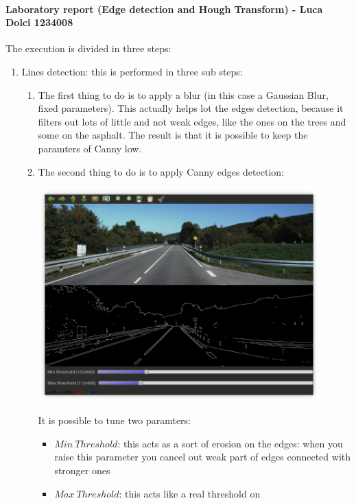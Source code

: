 \documentclass[11pt, a4paper]{toptesi}
\begin{document}
\paragraph{Laboratory report (Edge detection and Hough Transform) - Luca Dolci 1234008}
The execution is divided in three steps:
\begin{enumerate}
    \item Lines detection: this is performed in three sub steps:
        \begin{enumerate}
            \item The first thing to do is to apply a blur (in this case a
                Gaussian Blur, fixed parameters). This actually helps  lot the
                edges detection, because it filters out lots of little and not
                weak edges, like the ones on the trees and some on
                the asphalt. The result is that it is possible to keep the
                paramters of Canny low.
            \item The second thing to do is to apply Canny edges detection:
                \begin{center}
                    \includegraphics[width=0.9\textwidth]{./canny_demo.png}
                \end{center}
                It is possible to tune two paramters:
                \begin{itemize}
                    \item $Min\ Threshold$: this acts as a sort of erosion on the
                        edges: when you raise this parameter you cancel out
                        weak part of edges connected with stronger
                        ones
                    \item $Max\ Threshold$: this acts like a real threshold on

\end{itemize}
\end{enumerate}
\end{enumerate}
\end{document}
